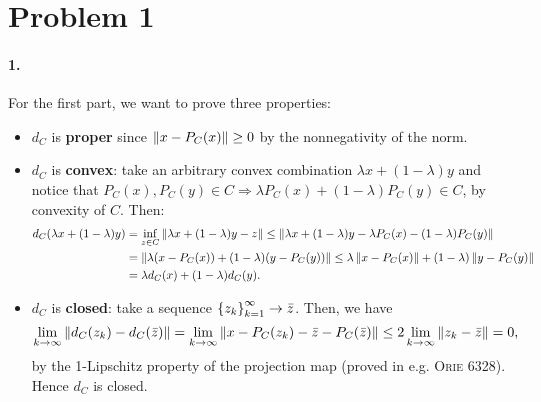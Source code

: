\documentclass[10pt]{article}
\begin{document}
\allowdisplaybreaks
\everymath{\displaystyle}
\newenvironment{longlisting}{\captionsetup{type=listing}}{}


\section*{Problem 1}
\paragraph{1.}
For the first part, we want to prove three properties:
\begin{itemize}
\item $d_{C}$ is \textbf{proper} since $\left \| x - P_C(x) \right \| \geq 0$ by the
nonnegativity of the norm.
\item $d_{C}$ is \textbf{convex}: take an arbitrary convex combination $
\lambda x + (1 - \lambda) y$ and notice that $P_C(x), P_C(y) \in C \Rightarrow
\lambda P_C(x) + (1 - \lambda) P_C(y) \in C$, by convexity of $C$. Then:
\begin{align*}
    d_C(\lambda x + (1 - \lambda)y) &= \inf_{z \in C}
    \left \| \lambda x + (1 - \lambda) y - z \right \| \leq
    \left \| \lambda x + (1 - \lambda) y - \lambda P_C(x) - (1 - \lambda) P_C(y) \right \|
    \\
    &= \left \| \lambda(x  - P_C(x)) + (1 - \lambda)(y - P_C(y)) \right \| \leq
       \lambda \left \| x - P_C(x) \right \| + (1 - \lambda) \left \| y - P_C(y) \right \| \\
    &=   \lambda d_C(x) + (1 - \lambda) d_C(y).
\end{align*}
\item $d_C$ is \textbf{closed}: take a sequence
$\left\{ z_k \right\}_{k=1}^{\infty} \to \bar{z}$. Then, we have
\[
    \lim_{k \to \infty} \left \| d_C(z_k) - d_C(\bar{z}) \right \| =
    \lim_{k \to \infty} \left \| x - P_C(z_k) - \bar{z} - P_C(\bar{z}) \right \| \leq
    2 \lim_{k \to \infty} \left \| z_k - \bar{z} \right \| = 0,
\]
by the 1-Lipschitz property of the projection map (proved in e.g. \textsc{Orie
6328}). Hence $d_C$ is closed.
\end{itemize}
\end{document}
